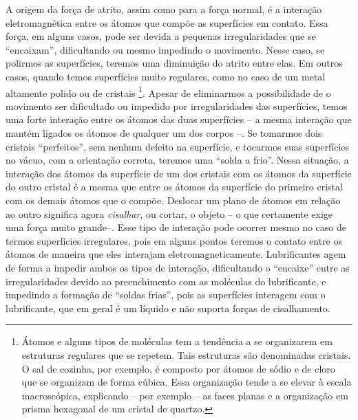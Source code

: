 A origem da força de atrito, assim como para a força normal, é a interação eletromagnética entre os átomos que compõe as superfícies em contato. Essa força, em alguns casos, pode ser devida a pequenas irregularidades que se ``encaixam'', dificultando ou mesmo impedindo o movimento. Nesse caso, se polirmos as superfícies, teremos uma diminuição do atrito entre elas. Em outros casos, quando temos superfícies muito regulares, como no caso de um metal altamente polido ou de cristais \footnote{Átomos e alguns tipos de moléculas tem a tendência a se organizarem em estruturas regulares que se repetem. Tais estruturas são denominadas cristais. O sal de cozinha, por exemplo, é composto por átomos de sódio e de cloro que se organizam de forma cúbica. Essa organização tende a se elevar à escala macroscópica, explicando -- por exemplo -- as faces planas e a organização em prisma hexagonal de um cristal de quartzo.}. Apesar de eliminarmos a possibilidade de o movimento ser dificultado ou impedido por irregularidades das superfícies, temos uma forte interação entre os átomos das duas superfícies -- a mesma interação que mantém ligados os átomos de qualquer um dos corpos --. Se tomarmos dois cristais ``perfeitos'', sem nenhum defeito na superfície, e tocarmos suas superfícies no vácuo, com a orientação correta, teremos uma ``solda a frio''. Nessa situação, a interação dos átomos da superfície de um dos cristais com os átomos da superfície do outro cristal é a mesma que entre os átomos da superfície do primeiro cristal com os demais átomos que o compõe. Deslocar um plano de átomos em relação ao outro significa agora \emph{cisalhar}, ou cortar, o objeto -- o que certamente exige uma força muito grande--. Esse tipo de interação pode ocorrer mesmo no caso de termos superfícies irregulares, pois em alguns pontos teremos o contato entre os átomos de maneira que eles interajam eletromagneticamente. Lubrificantes agem de forma a impedir ambos os tipos de interação, dificultando o ``encaixe'' entre as irregularidades devido ao preenchimento com as moléculas do lubrificante, e impedindo a formação de ``soldas frias'', pois as superfícies interagem com o lubrificante, que em geral é um líquido e não suporta forças de cisalhamento.


